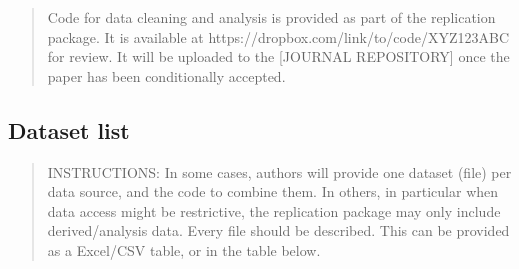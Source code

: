 \documentclass[
]{article}
\begin{document}
\begin{quote}
Code for data cleaning and analysis is provided as part of the
replication package. It is available at
https://dropbox.com/link/to/code/XYZ123ABC for review. It will be
uploaded to the {[}JOURNAL REPOSITORY{]} once the paper has been
conditionally accepted.
\end{quote}

\hypertarget{dataset-list}{%
\subsection{Dataset list}\label{dataset-list}}

\begin{quote}
INSTRUCTIONS: In some cases, authors will provide one dataset (file) per
data source, and the code to combine them. In others, in particular when
data access might be restrictive, the replication package may only
include derived/analysis data. Every file should be described. This can
be provided as a Excel/CSV table, or in the table below.
\end{quote}
\end{document}

